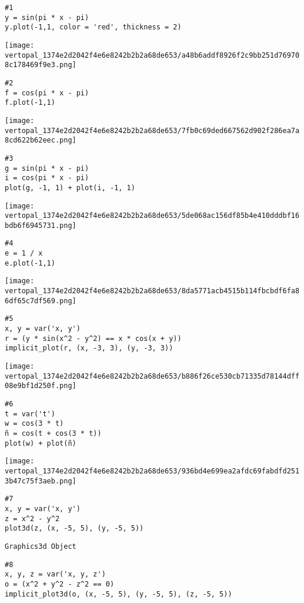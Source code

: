 \documentclass[
]{article}
\author{}
\date{}
\begin{document}
\begin{verbatim}
#1
y = sin(pi * x - pi) 
y.plot(-1,1, color = 'red', thickness = 2)
\end{verbatim}

\texttt{[image: vertopal\_1374e2d2042f4e6e8242b2b2a68de653/a48b6addf8926f2c9bb251d769708c178469f9e3.png]}

\begin{verbatim}
#2
f = cos(pi * x - pi)
f.plot(-1,1)
\end{verbatim}

\texttt{[image: vertopal\_1374e2d2042f4e6e8242b2b2a68de653/7fb0c69ded667562d902f286ea7a8cd622b62eec.png]}

\begin{verbatim}
#3
g = sin(pi * x - pi)
i = cos(pi * x - pi)
plot(g, -1, 1) + plot(i, -1, 1)
\end{verbatim}

\texttt{[image: vertopal\_1374e2d2042f4e6e8242b2b2a68de653/5de068ac156df85b4e410dddbf16bdb6f6945731.png]}

\begin{verbatim}
#4
e = 1 / x
e.plot(-1,1)
\end{verbatim}

\texttt{[image: vertopal\_1374e2d2042f4e6e8242b2b2a68de653/8da5771acb4515b114fbcbdf6fa86df65c7df569.png]}

\begin{verbatim}
#5
x, y = var('x, y')
r = (y * sin(x^2 - y^2) == x * cos(x + y))
implicit_plot(r, (x, -3, 3), (y, -3, 3))
\end{verbatim}

\texttt{[image: vertopal\_1374e2d2042f4e6e8242b2b2a68de653/b886f26ce530cb71335d78144dff08e9bf1d250f.png]}

\begin{verbatim}
#6
t = var('t')
w = cos(3 * t)
ñ = cos(t + cos(3 * t))
plot(w) + plot(ñ)
\end{verbatim}

\texttt{[image: vertopal\_1374e2d2042f4e6e8242b2b2a68de653/936bd4e699ea2afdc69fabdfd2513b47c75f3aeb.png]}

\begin{verbatim}
#7
x, y = var('x, y')
z = x^2 - y^2
plot3d(z, (x, -5, 5), (y, -5, 5))
\end{verbatim}

\begin{verbatim}
Graphics3d Object
\end{verbatim}

\begin{verbatim}
#8
x, y, z = var('x, y, z')
o = (x^2 + y^2 - z^2 == 0)
implicit_plot3d(o, (x, -5, 5), (y, -5, 5), (z, -5, 5))
\end{verbatim}
\end{document}
